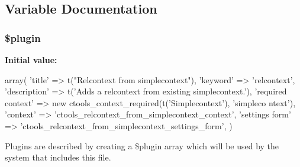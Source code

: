 \subsection{Variable Documentation}
\hypertarget{relcontext__from__simplecontext_8inc_ada8a7130088351710bb02ed622d6bf65}{
\subsubsection[{\$plugin}]{\setlength{\rightskip}{0pt plus 5cm}\$plugin}}
\label{relcontext__from__simplecontext_8inc_ada8a7130088351710bb02ed622d6bf65}
{\bfseries Initial value:}
\begin{DoxyCode}
 array(
  'title' => t("Relcontext from simplecontext"),
  'keyword' => 'relcontext',
  'description' => t('Adds a relcontext from existing simplecontext.'),
  'required context' => new ctools_context_required(t('Simplecontext'), 'simpleco
      ntext'),
  'context' => 'ctools_relcontext_from_simplecontext_context',
  'settings form' => 'ctools_relcontext_from_simplecontext_settings_form',
)
\end{DoxyCode}
Plugins are described by creating a \$plugin array which will be used by the system that includes this file. 